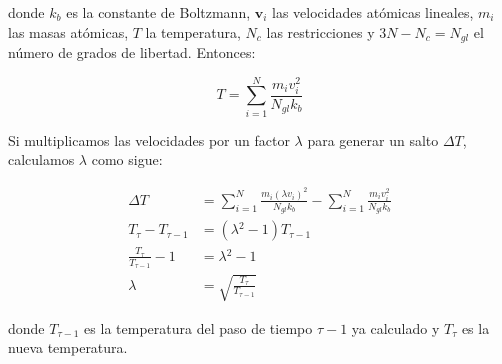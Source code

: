 donde $k_{b}$ es la constante de Boltzmann, $\mathbf{v}_{i}$ las velocidades atómicas lineales, $m_{i}$ las masas atómicas, $T$ la temperatura, $N_{c}$ las restricciones y $3N-N_{c} = N_{gl}$ el número de grados de libertad. Entonces:

\begin{equation}
T = \sum_{i=1}^{N}\frac{m_{i}v_{i}^{2}}{N_{gl}k_{b}}
\end{equation}

Si multiplicamos las velocidades por un factor $\lambda$ para generar un salto $\Delta{}T$, calculamos $\lambda$ como sigue:

\begin{align}
\Delta{}T &= \sum_{i=1}^{N}\frac{m_{i}(\lambda{}v_{i})^{2}}{N_{gl}k_{b}} - \sum_{i=1}^{N}\frac{m_{i}v_{i}^{2}}{N_{gl}k_{b}}\\
T_{\tau} - T_{\tau{}-1} &= (\lambda{}^{2}-1)T_{\tau{}-1}\\
\frac{T_{\tau}}{T_{\tau{}-1}} - 1 &= \lambda{}^{2}-1 \\
\lambda{} &= \sqrt{\frac{T_{\tau{}}}{T_{\tau{}-1}}}
\end{align}

donde $T_{\tau{}-1}$ es la temperatura del paso de tiempo $\tau{}-1$ ya calculado y $T_{\tau}$ es la nueva temperatura.
